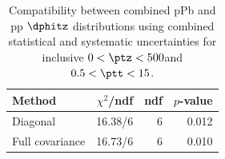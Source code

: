 \begin{table}[htp!]
\centering
\begin{tabular}{|l|r|r|r|}
\hline
Method & $\chi^2$/ndf & ndf & $p$-value \\
\hline
Diagonal & 16.38/6 & 6 & 0.012 \\
Full covariance & 16.73/6 & 6 & 0.010 \\
\hline
\end{tabular}
\caption{Compatibility between combined pPb and pp $\dphitz$ distributions using combined statistical and systematic uncertainties for inclusive $0 < \ptz < 500$\GeV and $0.5 < \ptt < 15$\GeV.}
\label{table:chisq_dphi}
\end{table}

